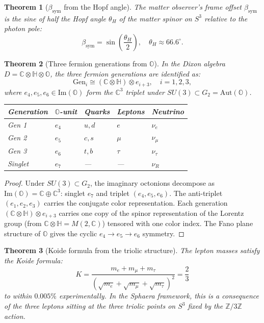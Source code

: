 \documentclass[12pt,a4paper]{article}
\newtheorem{theorem}{Theorem}[section]
\newcommand{\bsym}{\beta_{\mathrm{sym}}}
\newcommand{\HH}{\mathbb{H}}
\newcommand{\OO}{\mathbb{O}}
\begin{document}
\begin{theorem}[$\bsym$ from the Hopf angle]
The matter observer's frame offset $\bsym$ is the sine of half the Hopf
angle $\theta_H$ of the matter spinor on $S^3$ relative to the photon
pole:
\[
  \bsym = \sin\!\left(\frac{\theta_H}{2}\right),\quad\theta_H\approx 66.6^\circ.
\]
\end{theorem}

\begin{theorem}[Three fermion generations from $\OO$]
In the Dixon algebra $D=\mathbb{C}\otimes\HH\otimes\OO$, the three
fermion generations are identified as:
\[
  \mathrm{Gen}_i \cong (\mathbb{C}\otimes\HH)\otimes e_{i+3},
  \quad i=1,2,3,
\]
where $e_4,e_5,e_6\in\mathrm{Im}(\OO)$ form the $\mathbb{C}^3$ triplet
under $SU(3)\subset G_2=\mathrm{Aut}(\OO)$.
\begin{center}
\renewcommand{\arraystretch}{1.2}
\begin{tabular}{lllll}
\toprule
Generation & $\OO$-unit & Quarks & Leptons & Neutrino\\
\midrule
Gen 1 & $e_4$ & $u,d$ & $e$ & $\nu_e$\\
Gen 2 & $e_5$ & $c,s$ & $\mu$ & $\nu_\mu$\\
Gen 3 & $e_6$ & $t,b$ & $\tau$ & $\nu_\tau$\\
Singlet & $e_7$ & --- & --- & $\nu_R$\\
\bottomrule
\end{tabular}
\end{center}
\end{theorem}

\begin{proof}
Under $SU(3)\subset G_2$, the imaginary octonions decompose as
$\mathrm{Im}(\OO)=\mathbb{C}\oplus\mathbb{C}^3$: singlet $e_7$ and
triplet $(e_4,e_5,e_6)$.
The anti-triplet $(e_1,e_2,e_3)$ carries the conjugate color
representation.
Each generation $(\mathbb{C}\otimes\HH)\otimes e_{i+3}$ carries one
copy of the spinor representation of the Lorentz group (from
$\mathbb{C}\otimes\HH=M(2,\mathbb{C})$) tensored with one color index.
The Fano plane structure of $\OO$ gives the cyclic $e_4\to e_5\to e_6$
symmetry.
\end{proof}

\begin{theorem}[Koide formula from the triolic structure]
The lepton masses satisfy the Koide formula:
\[
  K = \frac{m_e+m_\mu+m_\tau}{(\sqrt{m_e}+\sqrt{m_\mu}+\sqrt{m_\tau})^2}
    = \frac{2}{3}
\]
to within $0.005\%$ experimentally.
In the Sphaera framework, this is a consequence of the three leptons
sitting at the three triolic points on $S^3$ fixed by the
$\mathbb{Z}/3\mathbb{Z}$ action.
\end{theorem}
\end{document}
